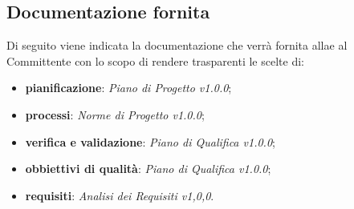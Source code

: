 \subsection{Documentazione fornita}
Di seguito viene indicata la documentazione che verrà fornita allae al Committente con lo scopo di rendere trasparenti le scelte di:
\begin{itemize}
	\item \textbf{pianificazione}: \textit{Piano di Progetto v1.0.0};
	\item \textbf{processi}: \textit{Norme di Progetto v1.0.0};
	\item \textbf{verifica e validazione}: \textit{Piano di Qualifica v1.0.0};
	\item \textbf{obbiettivi di qualità}: \textit{Piano di Qualifica v1.0.0};
	\item \textbf{requisiti}: \textit{Analisi dei Requisiti v1,0,0}.
\end{itemize}

